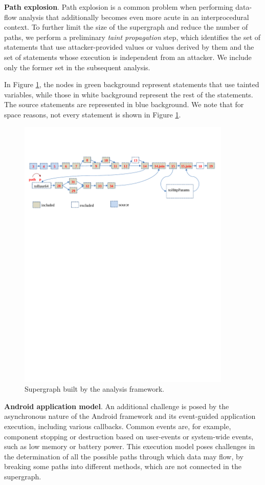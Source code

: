 \noindent
\textbf{Path explosion}. Path explosion is a common problem when performing data-flow analysis that additionally becomes even more acute in an interprocedural context. To further limit the size of the supergraph and reduce the number of paths, we perform a preliminary \textit{taint propagation} step, which identifies the set of statements that use attacker-provided values or values derived by them and the set of statements whose execution is independent from an attacker. We include only the former set in the subsequent analysis.

In Figure \ref{fig:supergraph}, the nodes in green background represent statements that use tainted variables, while those in white background represent the rest of the statements. The source statements are represented in blue background. We note that for space reasons, not every statement is shown in Figure \ref{fig:supergraph}. 

\begin{figure}[t]
  \centering
    \includegraphics[width=4in]{./images/supergraph.pdf}
  \caption{Supergraph built by the analysis framework. \label{fig:supergraph}}
 \end{figure}

\noindent
\textbf{Android application model}. An additional challenge is posed by the asynchronous nature of the Android framework and its event-guided application execution, including various callbacks. Common events are, for example, component stopping or destruction based on user-events or system-wide events, such as low memory or battery power. This execution model poses challenges in the determination of all the possible paths through which data may flow, by breaking some paths into different methods, which are not connected in the supergraph.

